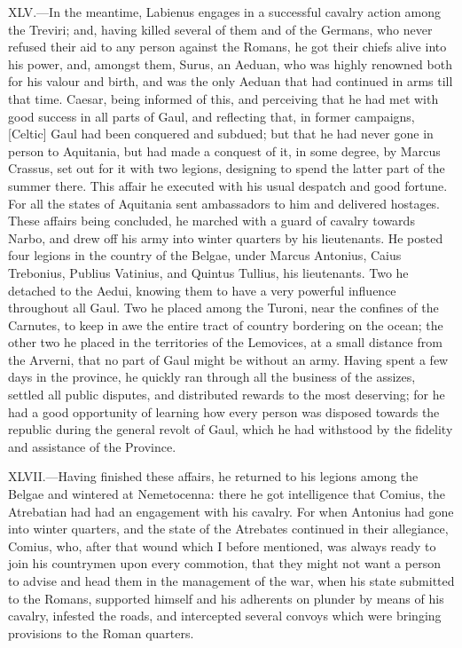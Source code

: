 XLV.—In the meantime, Labienus engages in a successful cavalry action
among the Treviri; and, having killed several of them and of the
Germans, who never refused their aid to any person against the Romans,
he got their chiefs alive into his power, and, amongst them, Surus, an
Aeduan, who was highly renowned both for his valour and birth, and was
the only Aeduan that had continued in arms till that time. Caesar, being
informed of this, and perceiving that he had met with good success in
all parts of Gaul, and reflecting that, in former campaigns, [Celtic]
Gaul had been conquered and subdued; but that he had never gone in
person to Aquitania, but had made a conquest of it, in some degree, by
Marcus Crassus, set out for it with two legions, designing to spend the
latter part of the summer there. This affair he executed with his usual
despatch and good fortune. For all the states of Aquitania sent
ambassadors to him and delivered hostages. These affairs being
concluded, he marched with a guard of cavalry towards Narbo, and drew
off his army into winter quarters by his lieutenants. He posted four
legions in the country of the Belgae, under Marcus Antonius, Caius
Trebonius, Publius Vatinius, and Quintus Tullius, his lieutenants. Two
he detached to the Aedui, knowing them to have a very powerful influence
throughout all Gaul. Two he placed among the Turoni, near the confines
of the Carnutes, to keep in awe the entire tract of country bordering on
the ocean; the other two he placed in the territories of the Lemovices,
at a small distance from the Arverni, that no part of Gaul might be
without an army. Having spent a few days in the province, he quickly ran
through all the business of the assizes, settled all public disputes,
and distributed rewards to the most deserving; for he had a good
opportunity of learning how every person was disposed towards the
republic during the general revolt of Gaul, which he had withstood by
the fidelity and assistance of the Province.

XLVII.—Having finished these affairs, he returned to his legions among
the Belgae and wintered at Nemetocenna: there he got intelligence that
Comius, the Atrebatian had had an engagement with his cavalry. For when
Antonius had gone into winter quarters, and the state of the Atrebates
continued in their allegiance, Comius, who, after that wound which I
before mentioned, was always ready to join his countrymen upon every
commotion, that they might not want a person to advise and head them in
the management of the war, when his state submitted to the Romans,
supported himself and his adherents on plunder by means of his cavalry,
infested the roads, and intercepted several convoys which were bringing
provisions to the Roman quarters.

